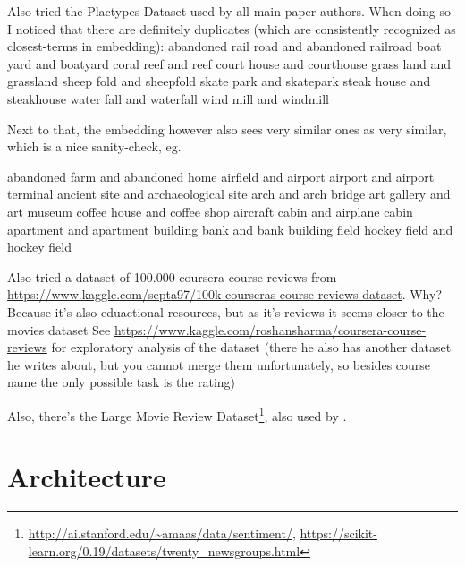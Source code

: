 \documentclass[11pt,
  paper=a4, 
  hidelinks,
  bibliography=totocnumbered,
	captions=tableheading,
	BCOR=10mm
]{scrreprt}
\theoremstyle{definition}
\begin{document}
Also tried the Plactypes-Dataset used by all main-paper-authors. When doing so I noticed that there are definitely duplicates (which are consistently recognized as closest-terms in embedding):
  abandoned rail road and abandoned railroad
  boat yard and boatyard
  coral reef and reef
  court house and courthouse
  grass land and grassland
  sheep fold and sheepfold
  skate park and skatepark
  steak house and steakhouse
  water fall and waterfall
  wind mill and windmill

Next to that, the embedding however also sees very similar ones as very similar, which is a nice sanity-check, eg.

  abandoned farm and abandoned home
  airfield and airport
  airport and airport terminal
  ancient site and archaeological site
  arch and arch bridge
  art gallery and art museum
  coffee house and coffee shop
  aircraft cabin and airplane cabin
  apartment and apartment building
  bank and bank building
  field hockey field and hockey field


Also tried a dataset of 100.000 coursera course reviews from \url{https://www.kaggle.com/septa97/100k-courseras-course-reviews-dataset}. Why? Because it's also eduactional resources, but as it's reviews it seems closer to the movies dataset
See \url{https://www.kaggle.com/roshansharma/coursera-course-reviews} for exploratory analysis of the dataset (there he also has another dataset he writes about, but you cannot merge them unfortunately, so besides course name the only possible task is the rating)

Also, there's the Large Movie Review Dataset\footnote{\url{http://ai.stanford.edu/~amaas/data/sentiment/}, \url{https://scikit-learn.org/0.19/datasets/twenty_newsgroups.html}}, also used by \cite{Ager2018}.


\section{Architecture}

\cite{Molder2021a}
\end{document}
